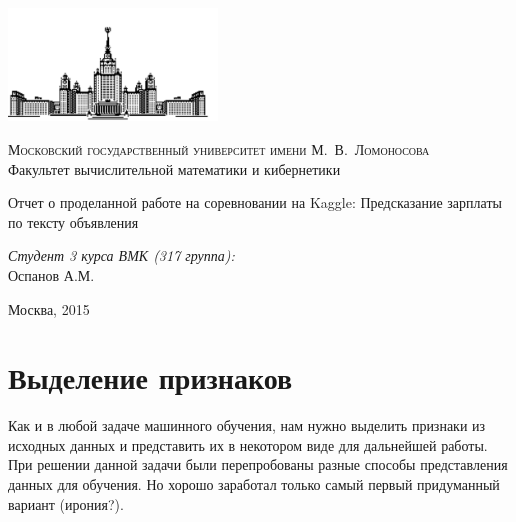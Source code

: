 \documentclass[12pt, a4paper]{article}
\begin{document}
    \thispagestyle{empty}

    \begin{singlespace}
    \begin{titlepage}
        \begin{center}
            \includegraphics[height = 3cm]{msu.png}

            {\scshape Московский государственный университет имени М.~В.~Ломоносова}\\
            Факультет вычислительной математики и кибернетики\\
            \centerline{\hfill\hrulefill\hrulefill\hrulefill\hrulefill\hfill}

            \vfill

            {\LARGE Отчет о проделанной работе на соревновании на Kaggle: Предсказание зарплаты по тексту объявления}

            \vspace{1cm}

        \end{center}

        \vfill
        \begin{flushright}
            \textit{Студент 3 курса ВМК (317 группа):}\\
                Оспанов А.М.

            \vspace{5mm}

        \end{flushright}

        \vfill

        \begin{center}
        Москва, 2015
        \end{center}
    \end{titlepage}
    \end{singlespace}

    \tableofcontents

    \newpage
    \section{Выделение признаков}
        Как и в любой задаче машинного обучения, нам нужно выделить признаки из исходных данных и представить их в некотором виде для дальнейшей работы. При решении данной задачи были перепробованы разные способы представления данных для обучения. Но хорошо заработал только самый первый придуманный вариант (ирония?).
\end{document}
